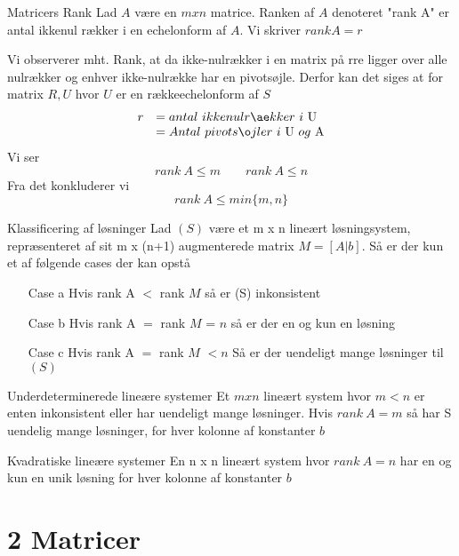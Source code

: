\documentclass[a4paper,fleqn]{article}
\begin{document}
	\begin{definition}{Matricers Rank}{}
		Lad $A$ være en $mxn$ matrice. Ranken af $A$ denoteret "rank A" er antal ikkenul
		rækker i en echelonform af $A$. Vi skriver $rank A = r$
	\end{definition}
	Vi observerer mht. Rank, at da ikke-nulrækker i en matrix på rre ligger over alle nulrækker
	og enhver ikke-nulrække har en pivotsøjle. Derfor kan det siges at for matrix $R,U$ hvor
	$U$ er en rækkeechelonform af $S$
	\begin{equation*}
		\begin{array}{ll}
			r &= antal\ ikkenulrækker\ i\ $U$\\
			  &= Antal\ pivotsøjler\ i\ $U$\ og\ $A$
		\end{array}
	\end{equation*}
	Vi ser
	\[ rank\ A \leq m \qquad rank\ A \leq n \]
	Fra det konkluderer vi
	\[ rank\ A \leq min\{m,n\} \]
	\begin{theorem}{Klassificering af løsninger}{}
		Lad $(S)$ være et m x n lineært løsningsystem, repræsenteret af sit m x (n+1) 
		augmenterede matrix $M =[A|b]$. Så er der kun et af følgende cases der kan opstå
		\begin{itemize}
			\item[Case a] Hvis rank A $<$ rank $M$ så  er (S) inkonsistent
			\item[Case b] Hvis rank A $=$ rank $M$ = $n$ så er der en og kun en løsning
			\item[Case c] Hvis rank A $=$ rank $M$ $< n$ Så er der uendeligt mange
				løsninger til $(S)$
		\end{itemize}
	\end{theorem}
	\begin{theorem}{Underdeterminerede lineære systemer}
		Et $m x n$ lineært system hvor $m < n$ er enten inkonsistent eller har uendeligt
		mange løsninger. Hvis $rank\ A = m$ så har S uendelig mange løsninger, for hver
		kolonne af konstanter $b$
	\end{theorem}
	\begin{theorem}{Kvadratiske lineære systemer}
		En n x n lineært system hvor $rank\ A = n$ har en og kun en unik løsning for hver
		kolonne af konstanter $b$
	\end{theorem}


	\section{2 Matricer}
\end{document}
